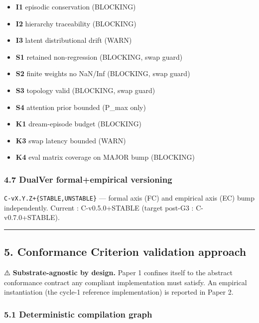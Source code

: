 \documentclass[
]{article}
\providecommand{\tightlist}{%
  \setlength{\itemsep}{0pt}\setlength{\parskip}{0pt}}
\begin{document}
\begin{itemize}
\tightlist
\item
  \textbf{I1} episodic conservation (BLOCKING)
\item
  \textbf{I2} hierarchy traceability (BLOCKING)
\item
  \textbf{I3} latent distributional drift (WARN)
\item
  \textbf{S1} retained non-regression (BLOCKING, swap guard)
\item
  \textbf{S2} finite weights no NaN/Inf (BLOCKING, swap guard)
\item
  \textbf{S3} topology valid (BLOCKING, swap guard)
\item
  \textbf{S4} attention prior bounded (P\_max only)
\item
  \textbf{K1} dream-episode budget (BLOCKING)
\item
  \textbf{K3} swap latency bounded (WARN)
\item
  \textbf{K4} eval matrix coverage on MAJOR bump (BLOCKING)
\end{itemize}

\subsubsection{4.7 DualVer formal+empirical
versioning}\label{dualver-formalempirical-versioning}

\texttt{C-vX.Y.Z+\{STABLE,UNSTABLE\}} --- formal axis (FC) and empirical
axis (EC) bump independently. Current : C-v0.5.0+STABLE (target post-G3
: C-v0.7.0+STABLE).

\begin{center}\rule{0.5\linewidth}{0.5pt}\end{center}

\subsection{5. Conformance Criterion validation
approach}\label{conformance-criterion-validation-approach}

⚠️ \textbf{Substrate-agnostic by design.} Paper 1 confines itself to the
abstract conformance contract any compliant implementation must satisfy.
An empirical instantiation (the cycle-1 reference implementation) is
reported in Paper 2.

\subsubsection{5.1 Deterministic compilation
graph}\label{deterministic-compilation-graph}
\end{document}
